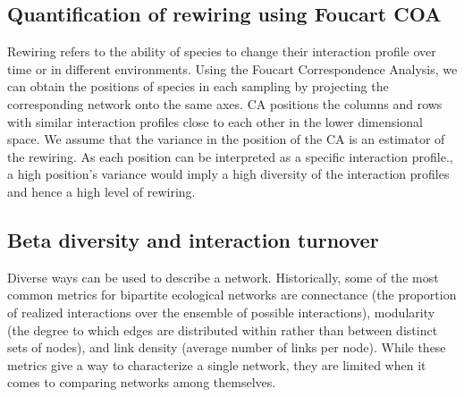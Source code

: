 \begin{table}[H]
    \centering
    \caption{Parameters for the experimentation}
    \label{parameter_table}
\end{table}



\subsection{Quantification of rewiring using Foucart COA}

Rewiring refers to the ability of species to change their interaction profile over time or in different environments. Using the Foucart Correspondence Analysis, we can obtain the positions of species in each sampling by projecting the corresponding network onto the same axes. CA positions the columns and rows with similar interaction profiles close to each other in the lower dimensional space.
We assume that the variance in the position of the CA is an estimator of the rewiring. As each position can be interpreted as a specific interaction profile., a high position's variance would imply a high diversity of the interaction profiles and hence a high level of rewiring.

\subsection{Beta diversity and interaction turnover}

Diverse ways can be used to describe a network. Historically, some of the most common metrics for bipartite ecological networks are connectance (the proportion of realized interactions over the ensemble of possible interactions), modularity (the degree to which edges are distributed within rather than between distinct sets of nodes), and link density (average number of links per node). While these metrics give a way to characterize a single network, they are limited when it comes to comparing networks among themselves.

